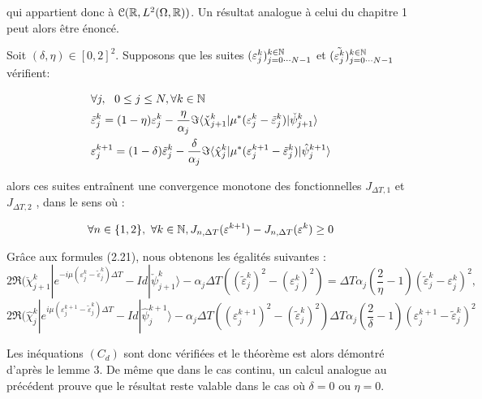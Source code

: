 qui appartient donc à $\mathcal{C}(\mathbb R, L^2( \Omega, \mathbb R))$. Un résultat analogue à celui du chapitre 1 peut alors être énoncé.

\begin{theorem}
	
	Soit $(\delta,\eta) \in [0,2]^2$. Supposons que les suites 
	$(\varepsilon_j^k)^{k\in\mathbb N}_{j = 0\cdots N-1}$ et $(\tilde{\varepsilon_j^k})^{k\in\mathbb N}_{j = 0\cdots N-1}$ vérifient:
	
	\begin{align}
	&\forall j, \ \ 0\leq j\leq N, \forall k \in \mathbb N \\ \nonumber
	&\tilde{\varepsilon}^k_j = (1-\eta)\varepsilon^k_j - \frac{\eta}{\alpha_j} \Im \langle  \check{\chi}^k_{j+1}|\mu^*(\varepsilon^k_j-\tilde{\varepsilon}^k_j)|\check{\psi}^k_{j+1} \rangle\\
	&\varepsilon^{k+1}_j = (1-\delta)\tilde{\varepsilon}^k_j - \frac{\delta}{\alpha_j} \Im \langle  \hat{\chi}^k_{j}|\mu^*(\varepsilon^{k+1}_j-\tilde{\varepsilon}^k_j)|\hat{\psi}^{k+1}_{j} \rangle \nonumber
	\end{align}
	
	alors ces suites entraînent une convergence monotone des fonctionnelles $J_{\Delta T,1}$ et $J_{\Delta T,2}$ , dans le sens où :
	
	$$ \forall n \in \{1,2\},\  \forall k \in \mathbb N, J_{n,\Delta T}(\varepsilon^{k+1}) - J_{n,\Delta T}(\varepsilon^k)\geq 0 $$
	
\end{theorem}

\begin{ proof }
	Grâce aux formules (2.21), nous obtenons les égalités suivantes :
	$$2\Re(\check{\chi}^k_{j+1}|e^{-i\mu(\varepsilon^k_j-\tilde{\varepsilon}^k_j)\Delta T}-Id|\check{\psi}^k_{j+1}\rangle - \alpha_j \Delta T ((\tilde{\varepsilon}^k_j)^2-(\varepsilon^k_j)^2) = \Delta T \alpha_j(\frac{2}{\eta}-1)(\tilde{\varepsilon}_j^k - \varepsilon^k_j)^2,$$
	$$ 2\Re(\hat{\chi}^k_j|e^{i\mu(\varepsilon^{k+1}_j-\tilde{\varepsilon}^k_j)\Delta T}-Id|\hat{\psi}^{k+1}_j\rangle - \alpha_j \Delta T ((\varepsilon^{k+1}_j)^2-(\tilde{\varepsilon}^k_j)^2)\Delta T \alpha_j(\frac{2}{\delta}-1)(\varepsilon^{k+1}_j-\tilde{\varepsilon}^k_j)^2$$
	
	Les inéquations $(C_d)$ sont donc vérifiées et le théorème est alors démontré d'après le lemme 3. De même que dans le cas continu, un calcul analogue au précédent prouve que le résultat reste valable dans le cas où $ \delta = 0$ ou $\eta = 0$.
\end{ proof }

